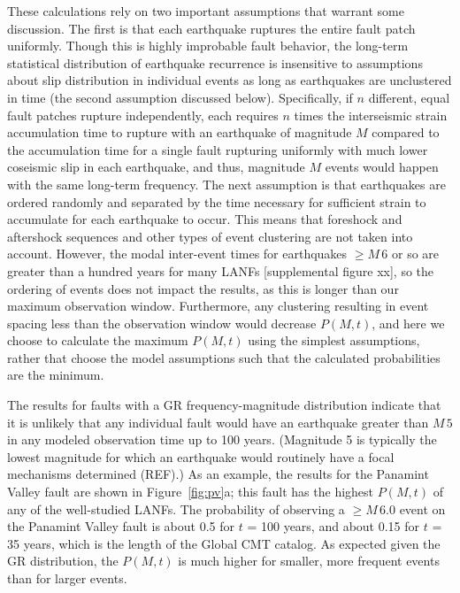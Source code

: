 \documentclass[twocolumn,grl]{AGUTeX}
\begin{document}
\begin{article}
These calculations rely on two important assumptions that warrant some
discussion.  The first is that each earthquake ruptures the entire
fault patch uniformly.  Though this is highly improbable fault behavior,
the long-term statistical distribution of earthquake recurrence is 
insensitive to assumptions about slip distribution in individual events as long as earthquakes are unclustered in time (the second assumption discussed below).
Specifically,
if $n$ different, equal fault patches rupture independently, each 
requires $n$ times the interseismic strain accumulation time to rupture with
an earthquake of magnitude $M$ compared to the accumulation time for a single fault rupturing uniformly
with much lower coseismic slip in each earthquake, and thus, magnitude $M$ events would happen with the same long-term
frequency.  The next assumption is that earthquakes are ordered randomly and
separated by the time necessary for sufficient strain to accumulate for each
earthquake to occur.  This means that foreshock and aftershock sequences
and other types of event clustering are not taken into account.  However,
the modal inter-event times for earthquakes $\ge M \,6$ or so are greater than
a hundred years for many LANFs [supplemental figure xx], so the ordering of
events does not impact the results, as this is longer than our maximum
observation window.  Furthermore, any clustering resulting in
event spacing less than the observation window would decrease $P(M,t)$, and
here we choose to calculate the maximum $P(M,t)$ using the simplest assumptions, rather that choose the model assumptions such that the calculated probabilities are the minimum.

The results for faults with a GR frequency-magnitude distribution
indicate that it is unlikely that any individual fault would have an earthquake
greater than $M \, 5$ in any modeled observation time up to 100 years.  
(Magnitude 5 is typically the lowest magnitude for which an earthquake would routinely have a focal mechanisms determined  (REF).) As an example, the results for the Panamint Valley fault are shown in
Figure~\ref{fig:pv}a;
this fault has the highest $P(M,t)$ of any of the well-studied LANFs.  The
probability of observing a $\ge M \, 6.0$ event on the Panamint Valley fault 
is about 0.5 for $t$ = 100 years, and about 0.15 for $t$ = 35 years, which is
the length of the Global CMT catalog. As expected given the GR distribution,
the $P(M,t)$ is much higher for smaller, more frequent events than for larger
events.  


\end{article}
\end{document}
